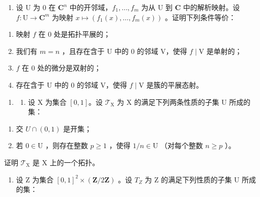 \begin{enumerate}
\def\labelenumi{\arabic{enumi})}
\setcounter{enumi}{5}
\tightlist
\item
  设 U 为 0 在 \(\mathbf{C}^{n}\) 中的开邻域，\(f_{1},\ldots ,f_{m}\) 为从 U 到 \(\mathbf{C}\) 中的解析映射。设 \(f\colon \mathrm{U}\to \mathbf{C}^m\) 为映射 \(x\mapsto (f_1(x),\dots ,f_m(x))\) 。证明下列条件等价：
\end{enumerate}

\begin{enumerate}
\def\labelenumi{(\roman{enumi})}
\item
  映射 \(f\) 在 0 处是拓扑平展的；
\item
  我们有 \(m = n\) ，且存在含于 U 中的 0 的邻域 V，使得 \(f \mid \mathrm{V}\) 是单射的；
\item
  \(f\) 在 0 处的微分是双射的；
\item
  存在含于 U 中的 0 的邻域 V，使得 \(f \mid \mathrm{V}\) 是簇的平展态射。
\end{enumerate}

\begin{enumerate}
\def\labelenumi{\arabic{enumi})}
\setcounter{enumi}{6}
\tightlist
\item
  \begin{enumerate}
  \def\labelenumii{\alph{enumii})}
  \tightlist
  \item
    设 X 为集合 \([0,1]\)。设 \(\mathcal{T}_{\mathrm{X}}\) 为 X 的满足下列两条性质的子集 U 所成的集：
  \end{enumerate}
\end{enumerate}

\begin{enumerate}
\def\labelenumi{(\roman{enumi})}
\item
  交 \(U\cap(0,1)\) 是开集；
\item
  若 \(0 \in \mathrm{U}\) ，则存在整数 \(p \geqslant 1\) ，使得 \(1/n \in \mathrm{U}\) （对每个整数 \(n \geqslant p\) ）。
\end{enumerate}

证明 \(\mathcal{T}_{\mathrm{X}}\) 是 X 上的一个拓扑。

\begin{enumerate}
\def\labelenumi{\alph{enumi})}
\setcounter{enumi}{1}
\tightlist
\item
  设 Z 为集合 \([0,1]^{2} \times (\mathbf{Z}/2\mathbf{Z})\) 。设 \(T_{Z}\) 为 Z 的满足下列性质的子集 U 所成的集：
\end{enumerate}

